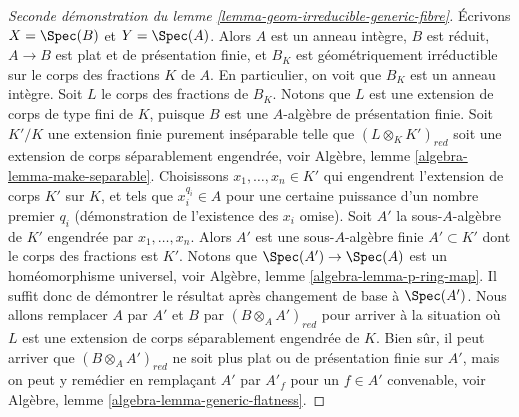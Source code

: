 \begin{proof}[Seconde démonstration du lemme \ref{lemma-geom-irreducible-generic-fibre}]
\medskip\noindent
Écrivons $X = \Spec(B)$ et $Y = \Spec(A)$. Alors $A$ est un anneau intègre,
$B$ est réduit, $A \to B$ est plat et de présentation finie, et $B_K$ est
géométriquement irréductible sur le corps des fractions $K$ de $A$.
En particulier, on voit que $B_K$ est un anneau intègre. Soit $L$ le corps des fractions
de $B_K$. Notons que
$L$ est une extension de corps de type fini de $K$, puisque $B$ est une $A$-algèbre
de présentation finie. Soit $K'/K$ une extension finie purement inséparable
telle que $(L \otimes_K K')_{red}$ soit une extension de corps séparablement engendrée,
voir
Algèbre, lemme \ref{algebra-lemma-make-separable}.
Choisissons $x_1, \ldots, x_n \in K'$ qui engendrent l'extension de corps
$K'$ sur $K$, et tels que $x_i^{q_i} \in A$ pour une certaine puissance d'un nombre premier
$q_i$ (démonstration de l'existence des $x_i$ omise). Soit $A'$ la sous-$A$-algèbre
de $K'$ engendrée par $x_1, \ldots, x_n$. Alors $A'$ est une
sous-$A$-algèbre finie $A' \subset K'$ dont le corps des fractions est $K'$. Notons que
$\Spec(A') \to \Spec(A)$ est un homéomorphisme universel, voir
Algèbre, lemme \ref{algebra-lemma-p-ring-map}.
Il suffit donc de démontrer le résultat après changement de base à $\Spec(A')$.
Nous allons remplacer $A$ par $A'$ et $B$ par $(B \otimes_A A')_{red}$
pour arriver à la situation où $L$ est une extension de corps séparablement engendrée
de $K$. Bien sûr, il peut arriver que $(B \otimes_A A')_{red}$ ne soit plus
plat ou de présentation finie sur $A'$, mais on peut y remédier en
remplaçant $A'$ par $A'_f$ pour un $f \in A'$ convenable, voir
Algèbre, lemme \ref{algebra-lemma-generic-flatness}.


\end{proof}
